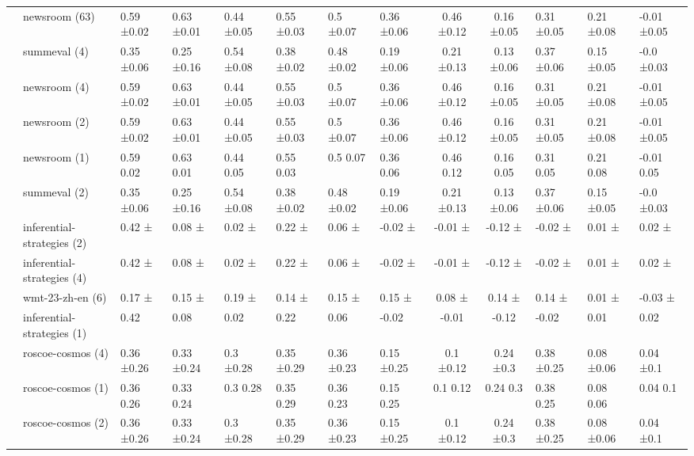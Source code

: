 \begin{tabular}{llllllll|cc}
 & newsroom (63) & 0.59 ±0.02 & 0.63 ±0.01 & 0.44 ±0.05 & 0.55 ±0.03 & 0.5 ±0.07 & 0.36 ±0.06 & 0.46 ±0.12 & 0.16 ±0.05 & 0.31 ±0.05 & 0.21 ±0.08 & -0.01 ±0.05 \\
 & summeval (4) & 0.35 ±0.06 & 0.25 ±0.16 & 0.54 ±0.08 & 0.38 ±0.02 & 0.48 ±0.02 & 0.19 ±0.06 & 0.21 ±0.13 & 0.13 ±0.06 & 0.37 ±0.06 & 0.15 ±0.05 & -0.0 ±0.03 \\
 & newsroom (4) & 0.59 ±0.02 & 0.63 ±0.01 & 0.44 ±0.05 & 0.55 ±0.03 & 0.5 ±0.07 & 0.36 ±0.06 & 0.46 ±0.12 & 0.16 ±0.05 & 0.31 ±0.05 & 0.21 ±0.08 & -0.01 ±0.05 \\
 & newsroom (2) & 0.59 ±0.02 & 0.63 ±0.01 & 0.44 ±0.05 & 0.55 ±0.03 & 0.5 ±0.07 & 0.36 ±0.06 & 0.46 ±0.12 & 0.16 ±0.05 & 0.31 ±0.05 & 0.21 ±0.08 & -0.01 ±0.05 \\
 & newsroom (1) & 0.59 0.02 & 0.63 0.01 & 0.44 0.05 & 0.55 0.03 & 0.5 0.07 & 0.36 0.06 & 0.46 0.12 & 0.16 0.05 & 0.31 0.05 & 0.21 0.08 & -0.01 0.05 \\
 & summeval (2) & 0.35 ±0.06 & 0.25 ±0.16 & 0.54 ±0.08 & 0.38 ±0.02 & 0.48 ±0.02 & 0.19 ±0.06 & 0.21 ±0.13 & 0.13 ±0.06 & 0.37 ±0.06 & 0.15 ±0.05 & -0.0 ±0.03 \\
 & inferential-strategies (2) & 0.42 ± & 0.08 ± & 0.02 ± & 0.22 ± & 0.06 ± & -0.02 ± & -0.01 ± & -0.12 ± & -0.02 ± & 0.01 ± & 0.02 ± \\
 & inferential-strategies (4) & 0.42 ± & 0.08 ± & 0.02 ± & 0.22 ± & 0.06 ± & -0.02 ± & -0.01 ± & -0.12 ± & -0.02 ± & 0.01 ± & 0.02 ± \\
 & wmt-23-zh-en (6) & 0.17 ± & 0.15 ± & 0.19 ± & 0.14 ± & 0.15 ± & 0.15 ± & 0.08 ± & 0.14 ± & 0.14 ± & 0.01 ± & -0.03 ± \\
 & inferential-strategies (1) & 0.42  & 0.08  & 0.02  & 0.22  & 0.06  & -0.02  & -0.01  & -0.12  & -0.02  & 0.01  & 0.02  \\
 & roscoe-cosmos (4) & 0.36 ±0.26 & 0.33 ±0.24 & 0.3 ±0.28 & 0.35 ±0.29 & 0.36 ±0.23 & 0.15 ±0.25 & 0.1 ±0.12 & 0.24 ±0.3 & 0.38 ±0.25 & 0.08 ±0.06 & 0.04 ±0.1 \\
 & roscoe-cosmos (1) & 0.36 0.26 & 0.33 0.24 & 0.3 0.28 & 0.35 0.29 & 0.36 0.23 & 0.15 0.25 & 0.1 0.12 & 0.24 0.3 & 0.38 0.25 & 0.08 0.06 & 0.04 0.1 \\
 & roscoe-cosmos (2) & 0.36 ±0.26 & 0.33 ±0.24 & 0.3 ±0.28 & 0.35 ±0.29 & 0.36 ±0.23 & 0.15 ±0.25 & 0.1 ±0.12 & 0.24 ±0.3 & 0.38 ±0.25 & 0.08 ±0.06 & 0.04 ±0.1 \\

\end{tabular}
